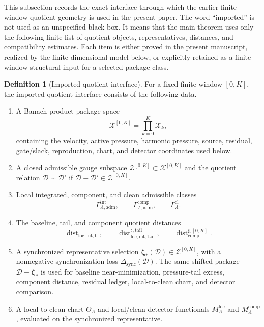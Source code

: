 \documentclass[11pt]{article}
\numberwithin{equation}{section}
\theoremstyle{definition}
\newtheorem{definition}[definition]{Definition}
\theoremstyle{remark}
\newcommand{\loc}{\mathrm{loc}}
\newcommand{\intg}{\mathrm{int}}
\newcommand{\tail}{\mathrm{tail}}
\newcommand{\adm}{\mathrm{adm}}
\newcommand{\cl}{\mathrm{cl}}
\newcommand{\comp}{\mathrm{comp}}
\newcommand{\sync}{\mathrm{sync}}
\newcommand{\Dist}{\operatorname{dist}}
\newcommand{\calD}{\mathcal D}
\newcommand{\calX}{\mathcal X}
\newcommand{\calZ}{\mathcal Z}
\newcommand{\bzeta}{\boldsymbol\zeta}
\begin{document}
This subsection records the exact interface through which the earlier finite-window quotient geometry is used in the present paper.  The word ``imported'' is not used as an unspecified black box.  It means that the main theorem uses only the following finite list of quotient objects, representatives, distances, and compatibility estimates.  Each item is either proved in the present manuscript, realized by the finite-dimensional model below, or explicitly retained as a finite-window structural input for a selected package class.

\begin{definition}[Imported quotient interface]\label{def:imported-quotient-interface}
For a fixed finite window \([0,K]\), the imported quotient interface consists of the following data.
\begin{enumerate}[label=\textup{(IQG\arabic*)},leftmargin=*]
    \item A Banach product package space
    \[
        \calX^{[0,K]}=\prod_{k=0}^K\calX_k,
    \]
    containing the velocity, active pressure, harmonic pressure, source, residual, gate/slack, reproduction, chart, and detector coordinates used below.
    \item A closed admissible gauge subspace \(\calZ^{[0,K]}\subset\calX^{[0,K]}\) and the quotient relation \(\calD\sim\calD'\) if \(\calD-\calD'\in\calZ^{[0,K]}\).
    \item Local integrated, component, and clean admissible classes
    \[
        \Gamma^{\intg}_{\Lambda,\adm},\qquad
        \Gamma^{\comp}_{\Lambda,\adm},\qquad
        \Gamma^{\cl}_{\Lambda}.
    \]
    \item The baseline, tail, and component quotient distances
    \[
        \Dist_{\loc,\intg,0},\qquad
        \Dist^{\sharp,\tail}_{\loc,\intg,\tail},\qquad
        \Dist^{\sharp,[0,K]}_{\comp}.
    \]
    \item A synchronized representative selection \(\bzeta_*(\calD)\in\calZ^{[0,K]}\), with a nonnegative synchronization loss \(\Delta_{\sync}(\calD)\).  The same shifted package \(\calD-\bzeta_*\) is used for baseline near-minimization, pressure-tail excess, component distance, residual ledger, local-to-clean chart, and detector comparison.
    \item A local-to-clean chart \(\Theta_\Lambda\) and local/clean detector functionals \(M^{\loc}_\Lambda\) and \(M^{\comp}_\Lambda\), evaluated on the synchronized representative.
\end{enumerate}
\end{definition}
\end{document}
